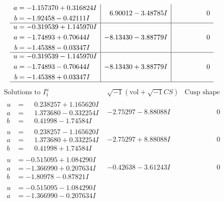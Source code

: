 \documentclass[1p]{elsarticle_modified}
\theoremstyle{definition}
\newcommand{\I}{\sqrt{-1}}
\begin{document}
$$\begin{array}{c|c|c}
\begin{aligned}
a &= -1.157370 + 0.316824 I \\
b &= -1.92458 - 0.42111 I\end{aligned}
 & \phantom{-}6.90012 - 3.48785 I & \phantom{-0.000000 } 0 \\ \hline\begin{aligned}
u &= -0.319539 + 1.145970 I \\
a &= -1.74893 + 0.70644 I \\
b &= -1.45388 - 0.03347 I\end{aligned}
 & -8.13430 - 3.88779 I & \phantom{-0.000000 } 0 \\ \hline\begin{aligned}
u &= -0.319539 - 1.145970 I \\
a &= -1.74893 - 0.70644 I \\
b &= -1.45388 + 0.03347 I\end{aligned}
 & -8.13430 + 3.88779 I & \phantom{-0.000000 } 0\\
 \hline 
 \end{array}$$\newpage$$\begin{array}{c|c|c}  
\text{Solutions to }I^u_{1}& \I (\text{vol} + \sqrt{-1}CS) & \text{Cusp shape}\\
 \hline 
\begin{aligned}
u &= \phantom{-}0.238257 + 1.165620 I \\
a &= \phantom{-}1.373680 - 0.332254 I \\
b &= \phantom{-}0.41998 - 1.74584 I\end{aligned}
 & -2.75297 - 8.88088 I & \phantom{-0.000000 } 0 \\ \hline\begin{aligned}
u &= \phantom{-}0.238257 - 1.165620 I \\
a &= \phantom{-}1.373680 + 0.332254 I \\
b &= \phantom{-}0.41998 + 1.74584 I\end{aligned}
 & -2.75297 + 8.88088 I & \phantom{-0.000000 } 0 \\ \hline\begin{aligned}
u &= -0.515095 + 1.084290 I \\
a &= -1.366990 + 0.207634 I \\
b &= -1.80978 - 0.87821 I\end{aligned}
 & -0.42638 - 3.61243 I & \phantom{-0.000000 } 0 \\ \hline\begin{aligned}
u &= -0.515095 - 1.084290 I \\
a &= -1.366990 - 0.207634 I \\

\end{aligned}
\end{array}$$
\end{document}
